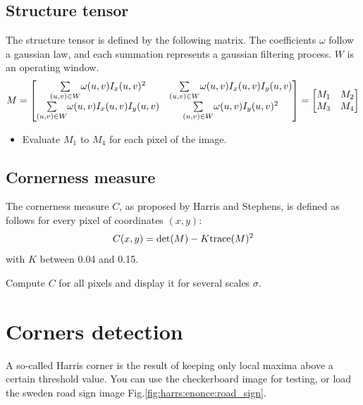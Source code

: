 \subsection{Structure tensor}
The structure tensor is defined by the following matrix. The coefficients $\omega$ follow a gaussian law, and each summation represents a gaussian filtering process. $W$ is an operating window.\vspace*{-7pt}
\[
M=
\begin{bmatrix}
\underset{(u,v)\in W}\sum \omega(u,v) I_x(u,v)^2 &\underset{(u,v)\in W} \sum \omega(u,v) I_x(u,v) I_y(u,v) \\
\underset{(u,v)\in W}\sum \omega(u,v) I_x(u,v) I_y(u,v) & \underset{(u,v)\in W}\sum \omega(u,v) I_y(u,v)^2
\end{bmatrix} =
\begin{bmatrix}
M_1 & M_2 \\
M_3 & M_4
\end{bmatrix}\vspace*{-8pt}
\]

\begin{qbox}
 \begin{itemize}
  \item Evaluate $M_1$ to $M_4$ for each pixel of the image.
 \end{itemize}

\end{qbox}

\vspace*{-2pt}

\subsection{Cornerness measure}
The cornerness measure $C$, as proposed by Harris and Stephens, is defined as follows for every pixel of coordinates $(x,y)$:\vspace*{-8pt}
\[ 
C(x,y) = \textrm{det}(M)-K \textrm{trace}(M)^2\vspace*{-8pt}
\]
with $K$ between 0.04 and 0.15.

\begin{qbox}
 Compute $C$ for all pixels and display it for several scales $\sigma$.
\end{qbox}

\section{Corners detection}
A so-called Harris corner is the result of keeping only local maxima above a certain threshold value.  You can use the checkerboard image for testing, or load the sweden road sign image Fig.\ref{fig:harrs:enonce:road_sign}.

